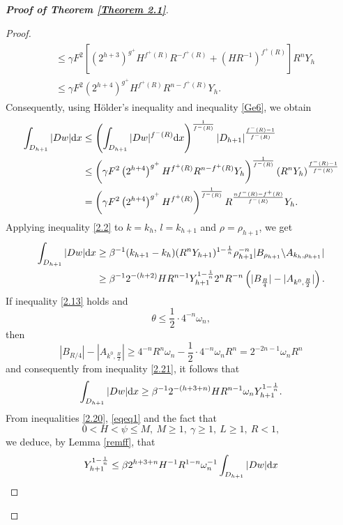 \documentclass[10pt,reqno]{amsart}
\newcommand *\w{^\wedge}
\theoremstyle{definition}
\numberwithin{equation}{section}
\begin{document}
\begin{proof}[\textbf{Proof of Theorem \ref{Theorem 2.1}}]
\begin{proof}
\begin{align}
\begin{split}
& \leq \gamma F^2\left[\left(2^{h+3}\right)^{g^+}H^{f^+(R)}R^{-f^+(R)}   + \left(HR^{-1}\right)^{f^+(R)} \right]R^nY_h\\
&\leq \gamma F^2\left(2^{h+4}\right)^{g^+} H^{f^+(R)} R^{n-f^+(R)}Y_h.
\end{split}
\end{align}
Consequently, using Hölder's inequality and inequality \eqref{Ge6}, we obtain
\begin{align}\label{2.20}
\begin{split}
\int_{D_{h+1}} |Dw| {\rm d}x &\leq \left( \int_{D_{h+1}} |Dw|^{f^-(R)} {\rm d}x \right)^{\frac{1}{f^-(R)}} |D_{h+1}|^{\frac{f^-(R)-1}{f^-(R)}}\\
&\leq \left( \gamma F^2\left(2^{h+4}\right)^{g^+} H^{f^+(R)} R^{n-f^+(R)}Y_h\right)^{\frac{1}{f^-(R)}} (R^n Y_h)^{\frac{f^-(R)-1}{f^-(R)}}\\
&= \left( \gamma F^2\left(2^{h+4}\right)^{g^+} H^{f^+(R)} \right)^{\frac{1}{f^-(R)}}R^{\frac{nf^-(R)-f^+(R)}{f^-(R)}}Y_h.
\end{split}
\end{align}
Applying inequality \eqref{2.2} to \(k = k_h\), \(l = k_{h+1}\) and \(\rho = \rho_{h+1}\), we get
\begin{align}\label{2.21}
\begin{split}
\int_{D_{h+1}} |Dw| {\rm d}x &\geq \beta^{-1} (k_{h+1} - k_h)(R^n Y_{h+1})^{1-\frac{1}{n}} \rho_{h+1}^{-n} |B_{\rho_{h+1}} \backslash A_{k_h, \rho_{h+1}}|\\
&\geq \beta^{-1} 2^{-(h+2)} HR^{n-1} Y_{h+1}^{1-\frac{1}{n}} 2^n R^{-n} \left(|B_{\frac{R}{4}}| - |A_{k^0, \frac{R}{2}}|\right).
\end{split}
\end{align}
If inequality \eqref{2.13} hol{\rm d}s and
\[
\theta \leq \frac{1}{2} \cdot 4^{-n} \omega_n,
\]
then
\[
|B_{R/4}| - |A_{k^0, \frac{R}{2}}| \geq 4^{-n}R^n\omega_n - \frac{1}{2} \cdot 4^{-n}\omega_nR^n = 2^{-2n-1}\omega_nR^n
\]
and consequently from inequality \eqref{2.21}, it follows that
\begin{equation}\label{eqeq1}
\int_{D_{h+1}} |Dw| {\rm d}x \geq \beta^{-1}2^{-(h+3+n)}HR^{n-1}\omega_n Y_{h+1}^{1-\frac{1}{n}}.
\end{equation}
From inequalities \eqref{2.20}, \eqref{eqeq1} and the fact that
\[0<H<\psi\leq M,\ M\geq 1,\ \gamma\geq 1,\ L\geq 1,\ R<1,\] 
we deduce, by Lemma \ref{remff}, that
\begin{align}
\begin{split}
Y_{h+1}^{1-\frac{1}{n}} &\leq \beta 2^{h+3+n}H^{-1}R^{1-n}\omega_n^{-1} \int_{D_{h+1}} |Dw| {\rm d}x\\

\end{split}
\end{align}
\end{proof}
\end{proof}
\end{document}

